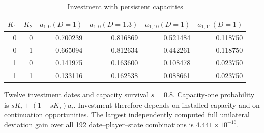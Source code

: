 \begin{table}[t]
\centering
\caption{Investment with persistent capacities}
\label{tab:r5_game}
\small
\begin{tabular}{rrrrrr}
\toprule
$K_1$ & $K_2$ & $a_{1,0}(D=1)$ & $a_{1,0}(D=1.3)$ & $a_{1,10}(D=1)$ & $a_{1,11}(D=1)$ \\
\midrule
0 & 0 & 0.700239 & 0.816869 & 0.521484 & 0.118750 \\
0 & 1 & 0.665094 & 0.812634 & 0.442261 & 0.118750 \\
1 & 0 & 0.141975 & 0.163600 & 0.108478 & 0.023750 \\
1 & 1 & 0.133116 & 0.162538 & 0.088661 & 0.023750 \\
\bottomrule
\end{tabular}
\par\medskip
\begin{minipage}{.97\linewidth}
\footnotesize Twelve investment dates and capacity survival $s=0.8$. Capacity-one probability is $sK_i+(1-sK_i)a_i$. Investment therefore depends on installed capacity and on continuation opportunities. The largest independently computed full unilateral deviation gain over all 192 date--player--state combinations is $4.441\times10^{-16}$.
\end{minipage}
\end{table}
